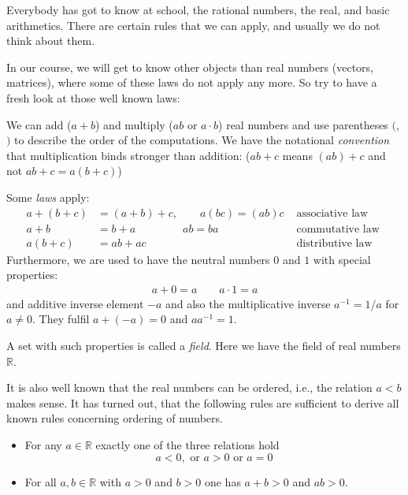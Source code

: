 

Everybody has got to know at school, the rational numbers, the real, and basic arithmetics. There are certain rules that 
we can apply, and usually we do not think about them. 

In our course, we will get to know other objects than real numbers (vectors, matrices), where some of these laws do not 
apply any more. So try to have a fresh look at those well known laws:

We can add ($a+b$) and multiply ($ab$ or $a\cdot b$) real numbers and use parentheses $($,$)$ to 
describe the order of the computations. We have the notational \emph{convention}
that multiplication binds stronger than addition: ($ab+c$ means $(ab)+c$ and not $ab+c=a(b+c)$)

Some \emph{laws} apply:
\begin{align*}
 a+(b+c)&=(a+b)+c, \qquad a(bc)=(ab)c  & \mbox{ associative law }\\
 a+b &=b+a \qquad \qquad \;  ab = ba & \mbox{ commutative law }\\
 a(b+c) &= ab+ac  & \mbox{ distributive law }
\end{align*}
Furthermore, we are used to have the neutral numbers $0$ and $1$ with special properties:
\begin{align*}
 a+0 = a \qquad a \cdot 1 = a
\end{align*}
and additive inverse element $-a$ and also the multiplicative inverse $a^{-1}=1/a$
for $a \neq 0$. They fulfil $a+(-a)=0$ and $a a^{-1}=1$. 

A set with such properties is called a \emph{field}. Here we have the field of real numbers $\mathbb{R}$.

It is also well known that the real numbers can be ordered, i.e., the relation $a < b$ makes sense. It has
turned out, that the following rules are sufficient to derive all known rules concerning ordering of numbers. 

\begin{itemize}
 \item For any $a \in \mathbb{R}$ exactly one of the three relations hold
 \[
  a < 0, \mbox{ or } a > 0 \mbox{ or } a = 0   
 \]
 \item For all $a,b\in \mathbb{R}$ with $a>0$ and $b>0$ one has $a+b > 0$ and $a b > 0$.
\end{itemize}

